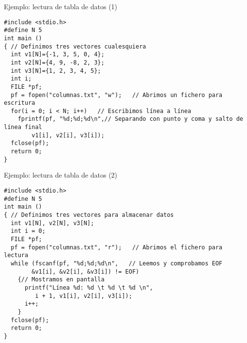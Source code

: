 \documentclass[usenames,svgnames,dvipsnames, aspectratio=169]{beamer}
\begin{document}
\begin{frame}[label={sec:org793abda},fragile,plain]{Ejemplo: lectura de tabla de datos (1)}
 \lstset{language=C,label= ,caption= ,captionpos=b,numbers=none}
\begin{lstlisting}
#include <stdio.h>
#define N 5
int main ()
{ // Definimos tres vectores cualesquiera
  int v1[N]={-1, 3, 5, 0, 4};
  int v2[N]={4, 9, -8, 2, 3};
  int v3[N]={1, 2, 3, 4, 5};
  int i;
  FILE *pf;
  pf = fopen("columnas.txt", "w");   // Abrimos un fichero para escritura
  for(i = 0; i < N; i++)   // Escribimos línea a línea
    fprintf(pf, "%d;%d;%d\n",// Separando con punto y coma y salto de línea final
	    v1[i], v2[i], v3[i]);
  fclose(pf);
  return 0;
}
\end{lstlisting}
\end{frame}

\begin{frame}[label={sec:orge730c23},fragile,plain]{Ejemplo: lectura de tabla de datos (2)}
 \lstset{language=C,label= ,caption= ,captionpos=b,numbers=none}
\begin{lstlisting}
#include <stdio.h>
#define N 5
int main ()
{ // Definimos tres vectores para almacenar datos
  int v1[N], v2[N], v3[N];
  int i = 0;
  FILE *pf;
  pf = fopen("columnas.txt", "r");   // Abrimos el fichero para lectura
  while (fscanf(pf, "%d;%d;%d\n",   // Leemos y comprobamos EOF
		&v1[i], &v2[i], &v3[i]) != EOF)
    {// Mostramos en pantalla
      printf("Línea %d: %d \t %d \t %d \n",
	     i + 1, v1[i], v2[i], v3[i]);
      i++;
    }
  fclose(pf);
  return 0;
}
\end{lstlisting}
\end{frame}
\end{document}
